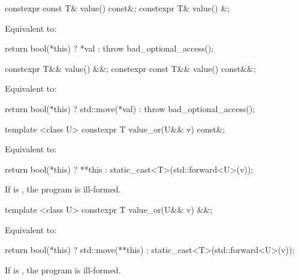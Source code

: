 %
\begin{itemdecl}
constexpr const T& value() const&;
constexpr T& value() &;
\end{itemdecl}

\begin{itemdescr}
\pnum
\effects
Equivalent to:
\begin{codeblock}
return bool(*this) ? *val : throw bad_optional_access();
\end{codeblock}
\end{itemdescr}

%
\begin{itemdecl}
constexpr T&& value() &&;
constexpr const T&& value() const&&;
\end{itemdecl}

\begin{itemdescr}

\pnum
\effects
Equivalent to:
\begin{codeblock}
return bool(*this) ? std::move(*val) : throw bad_optional_access();
\end{codeblock}
\end{itemdescr}

%
\begin{itemdecl}
template <class U> constexpr T value_or(U&& v) const&;
\end{itemdecl}

\begin{itemdescr}
\pnum
\effects
Equivalent to:
\begin{codeblock}
return bool(*this) ? **this : static_cast<T>(std::forward<U>(v));
\end{codeblock}

\pnum
\remarks
If  is ,
the program is ill-formed.
\end{itemdescr}

%
\begin{itemdecl}
template <class U> constexpr T value_or(U&& v) &&;
\end{itemdecl}

\begin{itemdescr}
\pnum
\effects
Equivalent to:
\begin{codeblock}
return bool(*this) ? std::move(**this) : static_cast<T>(std::forward<U>(v));
\end{codeblock}

\pnum
\remarks
If  is ,
the program is ill-formed.
\end{itemdescr}

